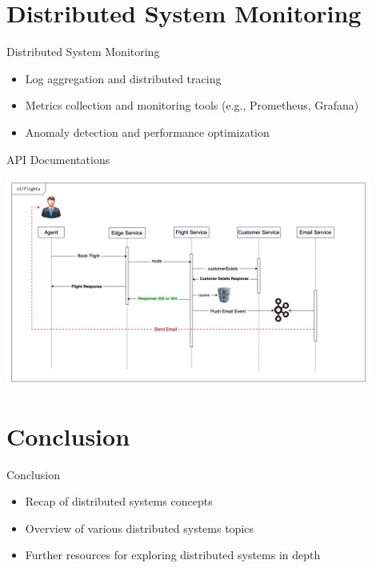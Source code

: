 \documentclass{beamer}
\begin{document}
\section{Distributed System Monitoring}
\begin{frame}{Distributed System Monitoring}
  \begin{itemize}
    \item Log aggregation and distributed tracing
    \item Metrics collection and monitoring tools (e.g., Prometheus, Grafana)
    \item Anomaly detection and performance optimization
  \end{itemize}
\end{frame}

\begin{frame}{API Documentations}
  \begin{center}
    \includegraphics[width=0.9\textwidth]{img/sd.png}
  \end{center}
\end{frame}

\section{Conclusion}
\begin{frame}{Conclusion}
  \begin{itemize}
    \item Recap of distributed systems concepts
    \item Overview of various distributed systems topics
    \item Further resources for exploring distributed systems in depth
  \end{itemize}
\end{frame}
\end{document}
